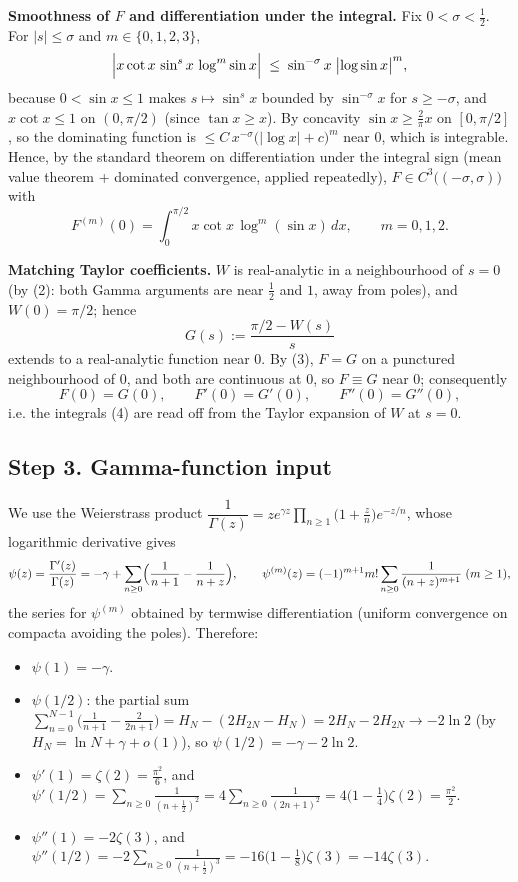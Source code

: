 \documentclass[11pt]{article}
\theoremstyle{remark}
\begin{document}
\textbf{Smoothness of $F$ and differentiation under the integral.} Fix $0<\sigma<\tfrac12$. For $|s|\le\sigma$ and $m\in\{0,1,2,3\}$,
$$\Bigl|x\cot x\,\sin^{s}x\,\log^{m}\sin x\Bigr|\;\le\;\sin^{-\sigma}x\;\bigl|\log\sin x\bigr|^{m},$$
because $0<\sin x\le 1$ makes $s\mapsto\sin^{s}x$ bounded by $\sin^{-\sigma}x$ for $s\ge-\sigma$, and $x\cot x\le 1$ on $(0,\pi/2)$ (since $\tan x\ge x$). By concavity $\sin x\ge\frac{2}{\pi}x$ on $[0,\pi/2]$, so the dominating function is $\le C\,x^{-\sigma}\bigl(|\log x|+c\bigr)^{m}$ near $0$, which is integrable. Hence, by the standard theorem on differentiation under the integral sign (mean value theorem + dominated convergence, applied repeatedly), $F\in C^{3}\bigl((-\sigma,\sigma)\bigr)$ with
\begin{equation}F^{(m)}(0)=\int_0^{\pi/2}x\cot x\,\log^{m}(\sin x)\,dx,\qquad m=0,1,2. \tag{4}\end{equation}

\textbf{Matching Taylor coefficients.} $W$ is real-analytic in a neighbourhood of $s=0$ (by (2): both Gamma arguments are near $\tfrac12$ and $1$, away from poles), and $W(0)=\pi/2$; hence
$$G(s):=\frac{\pi/2-W(s)}{s}$$
extends to a real-analytic function near $0$. By (3), $F=G$ on a punctured neighbourhood of $0$, and both are continuous at $0$, so $F\equiv G$ near $0$; consequently
\begin{equation}F(0)=G(0),\qquad F'(0)=G'(0),\qquad F''(0)=G''(0), \tag{5}\end{equation}
i.e. the integrals (4) are read off from the Taylor expansion of $W$ at $s=0$.

\subsection*{Step 3. Gamma-function input}

We use the Weierstrass product $\dfrac{1}{\Gamma(z)}=z e^{\gamma z}\prod_{n\ge1}\bigl(1+\tfrac zn\bigr)e^{-z/n}$, whose logarithmic derivative gives
$$\psi(z)=\frac{\Gamma'(z)}{\Gamma(z)}=-\gamma+\sum_{n\ge0}\Bigl(\frac{1}{n+1}-\frac{1}{n+z}\Bigr),
\qquad
\psi^{(m)}(z)=(-1)^{m+1}m!\sum_{n\ge0}\frac{1}{(n+z)^{m+1}}\;(m\ge1),$$
the series for $\psi^{(m)}$ obtained by termwise differentiation (uniform convergence on compacta avoiding the poles). Therefore:

\begin{itemize}
\item $\psi(1)=-\gamma$.
\item $\psi(1/2)$: the partial sum $\sum_{n=0}^{N-1}\bigl(\frac{1}{n+1}-\frac{2}{2n+1}\bigr)=H_N-(2H_{2N}-H_N)=2H_N-2H_{2N}\to-2\ln2$ (by $H_N=\ln N+\gamma+o(1)$), so $\psi(1/2)=-\gamma-2\ln 2$.
\item $\psi'(1)=\zeta(2)=\frac{\pi^{2}}{6}$, and $\psi'(1/2)=\sum_{n\ge0}\frac{1}{(n+\frac12)^{2}}=4\sum_{n\ge0}\frac{1}{(2n+1)^{2}}=4\bigl(1-\tfrac14\bigr)\zeta(2)=\frac{\pi^{2}}{2}$.
\item $\psi''(1)=-2\zeta(3)$, and $\psi''(1/2)=-2\sum_{n\ge0}\frac{1}{(n+\frac12)^{3}}=-16\bigl(1-\tfrac18\bigr)\zeta(3)=-14\zeta(3)$.
\end{itemize}
\end{document}
